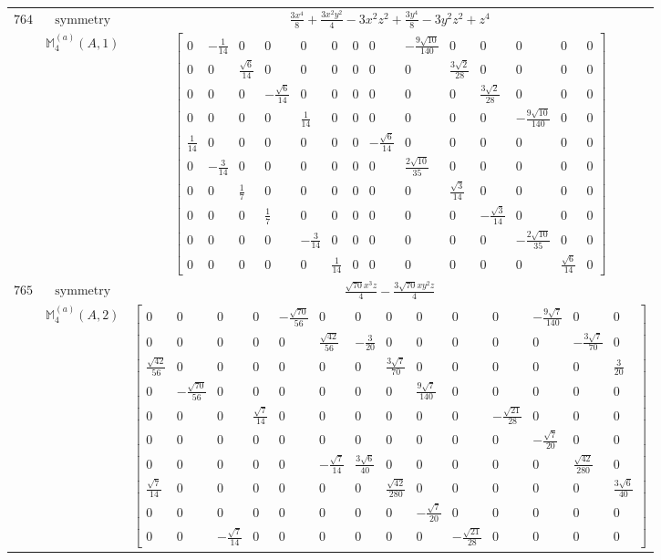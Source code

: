 \documentclass[fleqn,8pt,landscape]{jsarticle}
\begin{document}
\begin{longtable}{ccc}
$ 764 $ & $ \text{symmetry} $ & $ \frac{3 x^{4}}{8} + \frac{3 x^{2} y^{2}}{4} - 3 x^{2} z^{2} + \frac{3 y^{4}}{8} - 3 y^{2} z^{2} + z^{4} $ \\
$  $ & $ \mathbb{M}_{4}^{(a)}(A,1) $ & $ \begin{bmatrix} 0 & - \frac{1}{14} & 0 & 0 & 0 & 0 & 0 & 0 & - \frac{9 \sqrt{10}}{140} & 0 & 0 & 0 & 0 & 0 \\ 0 & 0 & \frac{\sqrt{6}}{14} & 0 & 0 & 0 & 0 & 0 & 0 & \frac{3 \sqrt{2}}{28} & 0 & 0 & 0 & 0 \\ 0 & 0 & 0 & - \frac{\sqrt{6}}{14} & 0 & 0 & 0 & 0 & 0 & 0 & \frac{3 \sqrt{2}}{28} & 0 & 0 & 0 \\ 0 & 0 & 0 & 0 & \frac{1}{14} & 0 & 0 & 0 & 0 & 0 & 0 & - \frac{9 \sqrt{10}}{140} & 0 & 0 \\ \frac{1}{14} & 0 & 0 & 0 & 0 & 0 & 0 & - \frac{\sqrt{6}}{14} & 0 & 0 & 0 & 0 & 0 & 0 \\ 0 & - \frac{3}{14} & 0 & 0 & 0 & 0 & 0 & 0 & \frac{2 \sqrt{10}}{35} & 0 & 0 & 0 & 0 & 0 \\ 0 & 0 & \frac{1}{7} & 0 & 0 & 0 & 0 & 0 & 0 & \frac{\sqrt{3}}{14} & 0 & 0 & 0 & 0 \\ 0 & 0 & 0 & \frac{1}{7} & 0 & 0 & 0 & 0 & 0 & 0 & - \frac{\sqrt{3}}{14} & 0 & 0 & 0 \\ 0 & 0 & 0 & 0 & - \frac{3}{14} & 0 & 0 & 0 & 0 & 0 & 0 & - \frac{2 \sqrt{10}}{35} & 0 & 0 \\ 0 & 0 & 0 & 0 & 0 & \frac{1}{14} & 0 & 0 & 0 & 0 & 0 & 0 & \frac{\sqrt{6}}{14} & 0 \end{bmatrix} $ \\ \hline
$ 765 $ & $ \text{symmetry} $ & $ \frac{\sqrt{70} x^{3} z}{4} - \frac{3 \sqrt{70} x y^{2} z}{4} $ \\
$  $ & $ \mathbb{M}_{4}^{(a)}(A,2) $ & $ \begin{bmatrix} 0 & 0 & 0 & 0 & - \frac{\sqrt{70}}{56} & 0 & 0 & 0 & 0 & 0 & 0 & - \frac{9 \sqrt{7}}{140} & 0 & 0 \\ 0 & 0 & 0 & 0 & 0 & \frac{\sqrt{42}}{56} & - \frac{3}{20} & 0 & 0 & 0 & 0 & 0 & - \frac{3 \sqrt{7}}{70} & 0 \\ \frac{\sqrt{42}}{56} & 0 & 0 & 0 & 0 & 0 & 0 & \frac{3 \sqrt{7}}{70} & 0 & 0 & 0 & 0 & 0 & \frac{3}{20} \\ 0 & - \frac{\sqrt{70}}{56} & 0 & 0 & 0 & 0 & 0 & 0 & \frac{9 \sqrt{7}}{140} & 0 & 0 & 0 & 0 & 0 \\ 0 & 0 & 0 & \frac{\sqrt{7}}{14} & 0 & 0 & 0 & 0 & 0 & 0 & - \frac{\sqrt{21}}{28} & 0 & 0 & 0 \\ 0 & 0 & 0 & 0 & 0 & 0 & 0 & 0 & 0 & 0 & 0 & - \frac{\sqrt{7}}{20} & 0 & 0 \\ 0 & 0 & 0 & 0 & 0 & - \frac{\sqrt{7}}{14} & \frac{3 \sqrt{6}}{40} & 0 & 0 & 0 & 0 & 0 & \frac{\sqrt{42}}{280} & 0 \\ \frac{\sqrt{7}}{14} & 0 & 0 & 0 & 0 & 0 & 0 & \frac{\sqrt{42}}{280} & 0 & 0 & 0 & 0 & 0 & \frac{3 \sqrt{6}}{40} \\ 0 & 0 & 0 & 0 & 0 & 0 & 0 & 0 & - \frac{\sqrt{7}}{20} & 0 & 0 & 0 & 0 & 0 \\ 0 & 0 & - \frac{\sqrt{7}}{14} & 0 & 0 & 0 & 0 & 0 & 0 & - \frac{\sqrt{21}}{28} & 0 & 0 & 0 & 0 \end{bmatrix} $ \\ \hline

\end{longtable}
\end{document}
